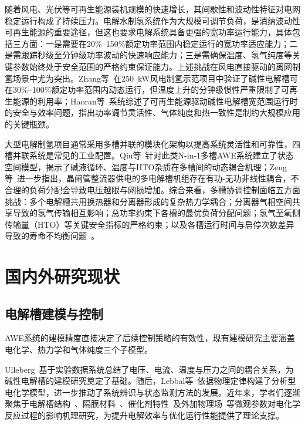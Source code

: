 随着风电、光伏等可再生能源装机规模的快速增长，其间歇性和波动性特征对电网稳定运行构成了持续压力。电解水制氢系统作为大规模可调节负荷，是消纳波动性可再生能源的重要途径，但这也要求电解系统具备更强的宽功率运行能力，具体包括三方面：一是需要在20\%--150\%额定功率范围内稳定运行的宽功率适应能力；二是需跟踪秒级至分钟级功率波动的快速响应能力；三是需确保温度、氢气纯度等关键参数始终处于安全范围的严格约束保证能力。上述挑战在风电直接驱动的离网制氢场景中尤为突出。Zhang等~\cite{Zhang2021IJHE_pilot}在250~kW风电制氢示范项目中验证了碱性电解槽可在30\%--100\%额定功率范围内动态运行，但温度上升的分钟级惯性严重限制了可再生能源的利用率；Haoran等~\cite{Haoran2024IJHE}系统综述了可再生能源驱动碱性电解槽宽范围运行时的安全与效率问题，指出功率调节灵活性、气体纯度和热一致性是制约大规模应用的关键瓶颈。

大型电解制氢项目通常采用多槽并联的模块化架构以提高系统灵活性和可靠性，四槽并联系统是常见的工业配置。Qiu等~\cite{Qiu2025arXiv}针对此类N-in-1多槽AWE系统建立了状态空间模型，揭示了碱液循环、温度与HTO杂质在多槽间的动态耦合机理；Zeng等~\cite{Zeng2025TSTE}进一步指出，晶闸管整流器供电的多电解槽机组存在有功-无功非线性耦合，不合理的负荷分配会导致电压越限与网损增加。综合来看，多槽协调控制面临五方面挑战：多个电解槽共用换热器和分离器形成的复杂热力学耦合；分离器气相空间共享导致的氢气传输相互影响；总功率约束下各槽的最优负荷分配问题；氢气至氧侧传输量（HTO）等关键安全指标的严格约束；以及各槽运行时间与启停次数差异导致的寿命不均衡问题~\cite{Zhou2025RE}。

\section{国内外研究现状}

\subsection{电解槽建模与控制}

AWE系统的建模精度直接决定了后续控制策略的有效性，现有建模研究主要涵盖电化学、热力学和气体纯度三个子模型。

Ulleberg~\cite{Ulleberg2003}基于实验数据系统总结了电压、电流、温度与压力之间的耦合关系，为碱性电解槽的建模研究奠定了基础。随后，Lebbal等~\cite{Lebbal2009}依据物理定律构建了分析型电化学模型，进一步推动了系统辨识与状态监测方法的发展。近年来，学者们逐渐聚焦于电解槽结构~\cite{Haverkort2021}、隔膜材料~\cite{Zhang2021Reactive}、催化剂特性~\cite{Darband2019}及外加物理场~\cite{Wang2010Gravity}等微观参数对电化学反应过程的影响机理研究，为提升电解效率与优化运行性能提供了理论支撑。

